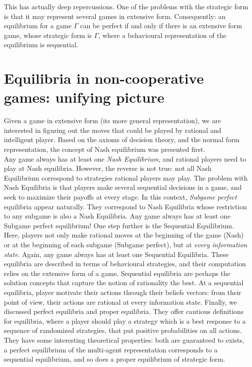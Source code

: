 This has actually deep repercussions. One of the problems with the strategic form is that it may represent several games in extensive form. 
Consequently: an equilibrium for a game $\Gamma$ can be perfect if and only if there is an extensive form game, whose strategic form is $\Gamma$, where a behavioural representation of the equilibrium is sequential. 


\section{Equilibria in non-cooperative games: unifying picture}

Given a game in extensive form (its more general representation), we are interested in figuring out the moves that could be played by rational and intelligent player. Based on the axioms of decision theory, and the normal form representation, the concept of Nash equilibrium was presented first.\\
Any game always has at least one \emph{Nash Equilibrium}, and rational players need to play at Nash equilibria. However, the reverse is not true: not all Nash Equilibrium correspond to strategies rational players may play.
The problem with Nash Equilibria is that players make several sequential decisions  in a game, and seek to maximize their payoffs at every stage. In this context, \emph{Subgame perfect} equilibria appear naturally. They correspond to Nash Equilibria whose restriction to any subgame is also a Nash Equilibria. Any game always has at least one Subgame perfect equilibrium!
One step further is the Sequential Equilibrium. Here, players not only make rational moves at the beginning of the game (Nash) or at the beginning of each subgame (Subgame perfect), but at \emph{every information state}. Again, any game always has at least one Sequential Equilibria. These equilibria are described in terms of behavioural strategies, and their computation relies on the extensive form of a game. Sequential equilibria are perhaps the solution concepts that capture the notion of rationality the best. At a sequential equilibria, player motivate their actions through their beliefs vectors: from their point of view, their actions are rational at every information state.
Finally, we discussed perfect equilibria and proper equilibria. 
They offer cautious definitions for equilibria, where a player should play a strategy which is a best response to a sequence of randomized strategies, that put positive probabilities on all actions. They have some interesting theoretical properties: both are guaranteed to exists, a perfect equilibrium of the multi-agent representation corresponds to a sequential equilibrium, and so does a proper equilibrium of strategic form. 

